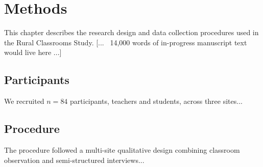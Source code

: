 \chapter{Methods}
\label{ch:methods}

This chapter describes the research design and data collection procedures used in the Rural Classrooms Study.
[... ~14,000 words of in-progress manuscript text would live here ...]

\section{Participants}
We recruited $n=84$ participants, teachers and students, across three sites...

\section{Procedure}
The procedure followed a multi-site qualitative design combining classroom observation and semi-structured interviews...

